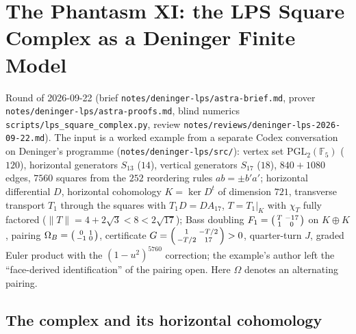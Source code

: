 \section{The Phantasm XI: the LPS Square Complex as a Deninger Finite Model}
\label{sec:deninger-lps}

Round of 2026-09-22 (brief \texttt{notes/deninger-lps/astra-brief.md}, prover \texttt{notes/deninger-lps/astra-proofs.md},
blind numerics \texttt{scripts/lps\_square\_complex.py}, review \texttt{notes/reviews/deninger-lps-2026-09-22.md}). The
input is a worked example from a separate Codex conversation on Deninger's programme (\texttt{notes/deninger-lps/src/}):
vertex set $\mathrm{PGL}_2(\mathbb F_5)$ ($120$), horizontal generators $S_{13}$ ($14$), vertical generators $S_{17}$ ($18$),
$840+1080$ edges, $7560$ squares from the $252$ reordering rules $ab = \pm b'a'$; horizontal differential $D$, horizontal
cohomology $K = \ker D^{t}$ of dimension $721$, transverse transport $T_1$ through the squares with $T_1D = DA_{17}$, $T = T_1|_K$
with $\chi_T$ fully factored ($\|T\| = 4+2\sqrt3<8<2\sqrt{17}$); Bass doubling $F_1 = \begin{psmallmatrix}T&-17\\1&0\end{psmallmatrix}$ on
$K\oplus K$, pairing $\Omega_B = \begin{psmallmatrix}0&1\\-1&0\end{psmallmatrix}$, certificate $G = \begin{psmallmatrix}1&-T/2\\-T/2&17\end{psmallmatrix}>0$, %
quarter-turn $J$, graded Euler product with the $(1-u^2)^{5760}$ correction; the example's author left the ``face-derived
identification'' of the pairing open. Here $\Omega$ denotes an alternating pairing. %

\subsection{The complex and its horizontal cohomology}

